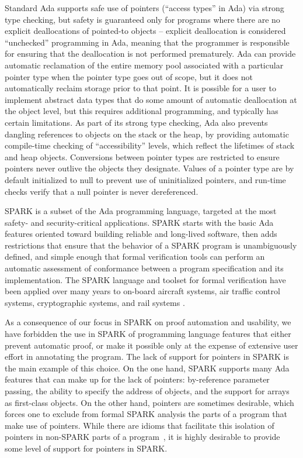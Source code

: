 \documentclass{llncs}
\begin{document}
Standard Ada supports safe use of pointers (``access types'' in Ada) via strong type checking, but safety is guaranteed only for programs where there are no explicit deallocations of pointed-to objects -- explicit deallocation is considered ``unchecked'' programming in Ada, meaning that the programmer is responsible for ensuring that the deallocation is not performed prematurely. Ada can provide automatic reclamation of the entire memory pool associated with a particular pointer type when the pointer type goes out of scope, but it does not automatically reclaim storage prior to that point. It is possible for a user to implement abstract data types that do some amount of automatic deallocation at the object level, but this requires additional programming, and typically has certain limitations. As part of its strong type checking, Ada also prevents dangling references to objects on the stack or the heap, by providing automatic compile-time checking of ``accessibility'' levels, which reflect the lifetimes of stack and heap objects.  Conversions between pointer types are restricted to ensure pointers never outlive the objects they designate. Values of a pointer type are by default initialized to null to prevent use of uninitialized pointers, and run-time checks verify that a null pointer is never dereferenced.


SPARK is a subset of the Ada programming language, targeted at the most safety- and security-critical applications. SPARK starts with the basic Ada features oriented toward building reliable and long-lived software, then adds restrictions that ensure that the behavior of a SPARK program is unambiguously defined, and simple enough that formal verification tools can perform an automatic assessment of conformance between a program specification and its implementation. The SPARK language and toolset for formal verification have been applied over many years to on-board aircraft systems,
air traffic control systems, cryptographic systems, and rail systems \cite{ONeill2012, McCormick2015}.

As a consequence of our focus in SPARK on proof automation and usability, we have forbidden the use in SPARK of programming language features that either prevent automatic proof, or make it possible only at the expense of extensive user effort in annotating the program. The lack of support for pointers in SPARK is the main example of this choice. On the one hand, SPARK supports many Ada features that can make up for the lack of pointers: by-reference parameter passing, the ability to specify the address of objects, and the support for arrays as first-class objects. On the other hand, pointers are sometimes desirable, which forces one to exclude from formal SPARK analysis the parts of a program that make use of pointers. While there are idioms that facilitate this isolation of pointers in non-SPARK parts of a program~\cite{AdaCoreThalesSPARK}, it is highly desirable to provide some level of support for pointers in SPARK.
\end{document}
